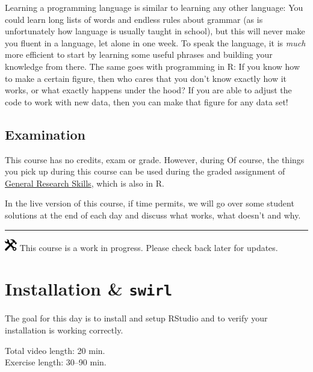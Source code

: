 \documentclass[
]{book}
\begin{document}
Learning a programming language is similar to learning any other language: You could learn long lists of words and endless rules about grammar (as is unfortunately how language is usually taught in school), but this will never make you fluent in a language, let alone in one week. To speak the language, it is \emph{much} more efficient to start by learning some useful phrases and building your knowledge from there. The same goes with programming in R: If you know how to make a certain figure, then who cares that you don't know exactly how it works, or what exactly happens under the hood? If you are able to adjust the code to work with new data, then you can make that figure for any data set!

\hypertarget{examination}{%
\section*{Examination}\label{examination}}

This course has no credits, exam or grade. However, during Of course, the things you pick up during this course can be used during the graded assignment of \href{https://fransrodenburg.github.io/General-Research-Skills/}{General Research Skills}, which is also in R.

In the live version of this course, if time permits, we will go over some student solutions at the end of each day and discuss what works, what doesn't and why.

\begin{center}\rule{0.5\linewidth}{0.5pt}\end{center}

\includegraphics[width=0.20833in,height=0.20833in]{figures/underconstruction.png} This course is a work in progress. Please check back later for updates.

\hypertarget{installation}{%
\chapter{\texorpdfstring{Installation \& \texttt{swirl}}{Installation \& swirl}}\label{installation}}

The goal for this day is to install and setup RStudio and to verify your installation is working correctly.

Total video length: 20 min.\\
Exercise length: 30--90 min.
\end{document}
